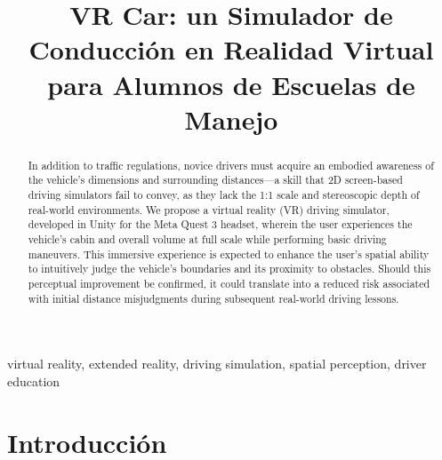 \documentclass[conference]{IEEEtran}
\begin{document}
\title{VR Car: un Simulador de Conducción en Realidad Virtual para Alumnos de Escuelas de Manejo}

\author{
\and
{}
\and
{}
}

\maketitle

\begin{abstract}
In addition to traffic regulations, novice drivers must acquire an embodied awareness of the vehicle's dimensions and surrounding distances—a skill that 2D screen-based driving simulators fail to convey, as they lack the 1:1 scale and stereoscopic depth of real-world environments. We propose a virtual reality (VR) driving simulator, developed in Unity for the Meta Quest 3 headset, wherein the user experiences the vehicle's cabin and overall volume at full scale while performing basic driving maneuvers. This immersive experience is expected to enhance the user's spatial ability to intuitively judge the vehicle's boundaries and its proximity to obstacles. Should this perceptual improvement be confirmed, it could translate into a reduced risk associated with initial distance misjudgments during subsequent real-world driving lessons.
\end{abstract}

\begin{IEEEkeywords}
virtual reality, extended reality, driving simulation, spatial perception, driver education
\end{IEEEkeywords}

\section{Introducción}
\label{sec:introduccion}
\end{document}
